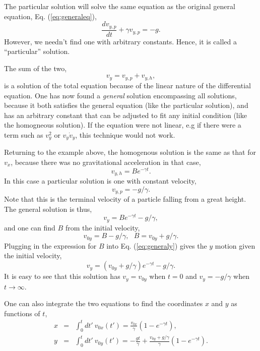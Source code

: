 The particular solution will solve the same equation as the original general equation, Eq. (\ref{eq:generaleq}),
\begin{equation}
\frac{dv_{y,p}}{dt}+\gamma v_{y,p}=-g.
\end{equation}
However, we needn't find one with arbitrary constants. Hence, it is called a ``particular'' solution. 

The sum of the two,
\begin{equation}
v_y=v_{y,p}+v_{y,h},
\end{equation}
is a solution of the total equation because of the linear nature of the differential equation. One has now found a {\it general} solution encompassing all solutions, because it both satisfies the general equation (like the particular solution), and has an arbitrary constant that can be adjusted to fit any initial condition (like the homogneous solution). If the equation were not linear, e.g if there were a term such as $v_y^2$ or $v_y\dot{v}_y$, this technique would not work.

Returning to the example above, the homogenous solution is the same as that for $v_x$, because there was no gravitational acceleration in that case,
\begin{equation}
v_{y,h}=Be^{-\gamma t}.
\end{equation}
In this case a particular solution is one with constant velocity,
\begin{equation}
v_{y,p}=-g/\gamma.
\end{equation}
Note that this is the terminal velocity of a particle falling from a great height. The general solution is thus,
\begin{equation}
\label{eq:generaly}
v_y=Be^{-\gamma t}-g/\gamma,
\end{equation}
and one can find $B$ from the initial velocity,
\begin{equation}
v_{0y}=B-g/\gamma,~~~B=v_{0y}+g/\gamma.
\end{equation}
Plugging in the expression for $B$ into Eq. (\ref{eq:generaly}) gives the $y$ motion given the initial velocity,
\begin{equation}
\label{eq:vyoft}
v_y=(v_{0y}+g/\gamma)e^{-\gamma t}-g/\gamma.
\end{equation}
It is easy to see that this solution has $v_y=v_{0y}$ when $t=0$ and $v_y=-g/\gamma$ when $t\rightarrow\infty$.

One can also integrate the two equations to find the coordinates $x$ and $y$ as functions of $t$,
\begin{eqnarray}
\label{eq:yoft}
x&=&\int_0^t dt'~v_{0x}(t')=\frac{v_{0x}}{\gamma}\left(1-e^{-\gamma t}\right),\\
\nonumber
y&=&\int_0^t dt'~v_{0y}(t')=-\frac{gt}{\gamma}+\frac{v_{0y}+g/\gamma}{\gamma}\left(1-e^{-\gamma t}\right).
\end{eqnarray}

